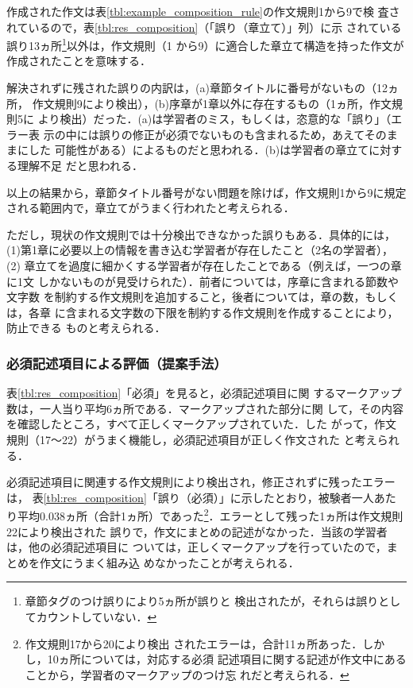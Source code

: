 \documentclass[japanese]{jnlp_1.4}
\def\mod{}
\begin{document}
作成された作文は表\ref{tbl:example_composition_rule}の作文規則1から9で検
査されているので，表\ref{tbl:res_composition}（「誤り（章立て）」列）に示
されている誤り13ヵ所\footnote{{\mod 章節タグのつけ誤りにより5ヵ所が誤りと
検出されたが，それらは誤りとしてカウントしていない．}}以外は，作文規則（1
から9）に適合した章立て構造を持った作文が作成されたことを意味する．

解決されずに残された誤りの内訳は，(a)章節タイトルに番号がないもの（12ヵ所，
作文規則9により検出），(b)序章が1章以外に存在するもの（1ヵ所，作文規則5に
より検出）だった．(a)は学習者のミス，もしくは，恣意的な「誤り」（エラー表
示の中には誤りの修正が必須でないものも含まれるため，あえてそのままにした
可能性がある）によるものだと思われる．(b)は学習者の章立てに対する理解不足
だと思われる．

以上の結果から，章節タイトル番号がない問題を除けば，作文規則1から9に規定
される範囲内で，章立てがうまく行われたと考えられる．

ただし，現状の作文規則では十分検出できなかった誤りもある．具体的には，
(1)第1章に必要以上の情報を書き込む学習者が存在したこと（2名の学習者），(2) 
章立てを過度に細かくする学習者が存在したことである（例えば，一つの章に1文
しかないものが見受けられた）．前者については，序章に含まれる節数や文字数
を制約する作文規則を追加すること，後者については，章の数，もしくは，各章
に含まれる文字数の下限を制約する作文規則を作成することにより，防止できる
ものと考えられる．


\subsubsection{必須記述項目による評価（提案手法）}\label{sssec:hissu}

表\ref{tbl:res_composition}「必須」を見ると，必須記述項目に関
するマークアップ数は，一人当り平均6ヵ所である．マークアップされた部分に関
して，その内容を確認したところ，すべて正しくマークアップされていた．した
がって，作文規則（17〜22）がうまく機能し，必須記述項目が正しく作文された
と考えられる．

必須記述項目に関連する作文規則により検出され，修正されずに残ったエラーは，
表\ref{tbl:res_composition}「誤り（必須）」に示したとおり，被験者一人あた
り平均0.038ヵ所（合計1ヵ所）であった\footnote{{\mod 作文規則17から20により検出
されたエラーは，合計11ヵ所あった．しかし，10ヵ所については，対応する必須
記述項目に関する記述が作文中にあることから，学習者のマークアップのつけ忘
れだと考えられる．}}．エラーとして残った1ヵ所は作文規則22により検出された
誤りで，作文にまとめの記述がなかった．当該の学習者は，他の必須記述項目に
ついては，正しくマークアップを行っていたので，まとめを作文にうまく組み込
めなかったことが考えられる．
\end{document}
